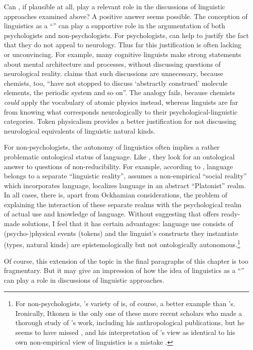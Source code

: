 \documentclass[output=paper]{langscibook}
\begin{document}
Can , if plausible at all, play a relevant role in the discussions of linguistic approaches examined above? A positive answer seems possible. The conception of linguistics as a ``'' can play a supportive role in the argumentation of both psychologists and non-psychologists. For psychologists,  can help to justify the fact that they do not appeal to neurology. Thus far this justification is often lacking or unconvincing. For example, many cognitive linguists \citep[cf., e.g., ][]{Langacker1999} make strong statements about mental architecture and processes, without discussing questions of neurological reality. \citet[5--6]{Chomsky1987} claims that such discussions are unnecessary, because chemists, too, ``have not stopped to discuss `abstractly construed' molecule elements, the periodic system and so on''. The analogy fails, because chemists \emph{could} apply the vocabulary of atomic physics instead, whereas linguists are far from knowing what corresponds neurologically to their psychological-linguistic categories. Token physicalism provides a better justification for not discussing neurological equivalents of linguistic natural kinds.

For non-psychologists, the autonomy of linguistics often implies a rather problematic ontological status of language. Like {\Kroeber}, they look for an ontological answer to questions of non-reducibility. For example, according to \citet{Cooper1975}, language belongs to a separate ``linguistic reality'', \citet{Itkonen1978}  assumes a non-empirical ``social reality'' which incorporates language, \citet{Katz1981} localizes language in an abstract ``Platonist'' realm. In all cases, there is, apart from Ockhamian considerations, the problem of explaining the interaction of these separate realms with the psychological realm of actual use and knowledge of language. Without suggesting that  offers ready-made solutions, I feel that it has certain advantages: language use consists of (psycho-)physical events (tokens) and the linguist's constructs they instantiate (types, natural kinds) are epistemologically but not ontologically autonomous.\footnote{For non-psychologists, {\Sapir}'s variety of  is, of course, a better example than {\Fodor}'s. Ironically, Itkonen is the only one of these more recent scholars who made a thorough study of {\Sapir}'s work, including his anthropological publications, but he seems to have missed \citet{Sapir1917}, and his interpretation of {\Sapir}'s view as identical to his own non-empirical view of linguistics is a mistake \citep[cf.][62--65]{Itkonen1978}.}

Of course, this extension of the topic in the final paragraphs of this chapter is too fragmentary. But it may give an impression of how the idea of linguistics as a ``'' can play a role in discussions of linguistic approaches.

\sloppy
\printbibliography[heading=subbibliography,notkeyword=this] 
\end{document}
